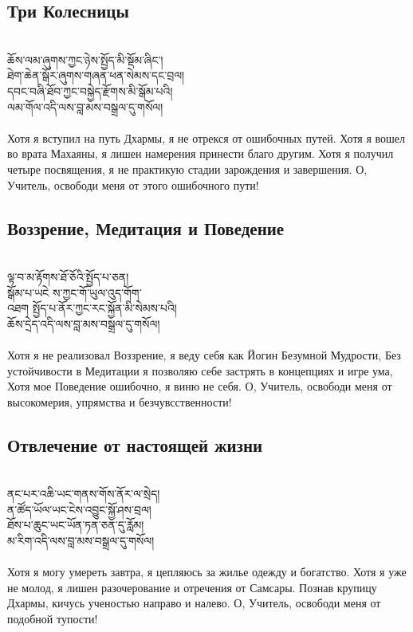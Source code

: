 \subsection*{Три Колесницы}
\\
\ti
ཆོས་ལམ་ཞུགས་ཀྱང་ཉེས་སྤྱོད་མི་སྡོམ་ཞིང་།\\
ཐེག་ཆེན་སྒོར་ཞུགས་གཞན་ཕན་སེམས་དང་བྲལ།\\
དབང་བཞི་ཐོབ་ཀྱང་བསྐྱེད་རྫོགས་མི་སྒོམ་པའི།\\
ལམ་གོལ་འདི་ལས་བླ་མས་བསྒྲལ་དུ་གསོལ།\\
\\
\ru
Хотя я вступил на путь Дхармы, я не отрекся от ошибочных путей.
Хотя я вошел во врата Махаяны, я лишен намерения принести благо другим.
Хотя я получил четыре посвящения, я не практикую стадии зарождения и завершения.
О, Учитель, освободи меня от этого ошибочного пути!

\subsection*{Воззрение, Медитация и Поведение}
\\
\ti
ལྟ་བ་མ་རྟོགས་ཐོ་ཅོའི་སྤྱོད་པ་ཅན།\\
སྒོམ་པ་ཡངེ ས་ཀྱང་གོ་ཡུལ་འུད་གོག་\\
འཐག སྤྱོད་པ་ནོར་ཀྱང་རང་སྐྱོན་མི་སེམས་པའི། \\
ཆོས་དྲེད་འདི་ལས་བླ་མས་བསྒྲལ་དུ་གསོལ།\\
\\
\ru
Хотя я не реализовал Воззрение, я веду себя как Йогин Безумной Мудрости,
Без устойчивости в Медитации я позволяю себе застрять в концепциях и игре ума,
Хотя мое Поведение ошибочно, я виню не себя.
О, Учитель, освободи меня от высокомерия, упрямства и безчувсственности!

\newpage
\subsection*{Отвлечение от настоящей жизни}
\\
\ti
ནང་པར་འཆི་ཡང་གནས་གོས་ནོར་ལ་སྲེད།\\
ན་ཚོད་ཡོལ་ཡང་ངེས་འབྱུང་སྐྱོ་ཤས་བྲལ། \\
ཐོས་པ་ཆུང་ཡང་ཡོན་ཏན་ཅན་དུ་རློམ། \\
མ་རིག་འདི་ལས་བླ་མས་བསྒྲལ་དུ་གསོལ།\\
\\
\ru
Хотя я могу умереть завтра, я цепляюсь за жилье одежду и богатство.
Хотя я уже не молод, я лишен разочерование и отречения от Самсары.
Познав крупицу Дхармы, кичусь ученостью направо и налево.
О, Учитель, освободи меня от подобной тупости!

